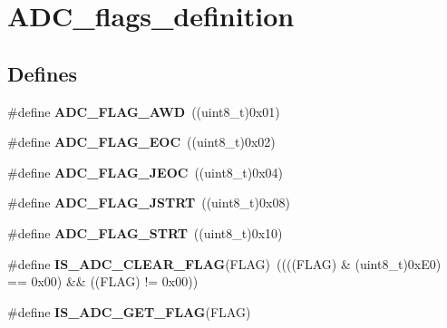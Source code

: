 \hypertarget{group__ADC__flags__definition}{
\section{ADC\_\-flags\_\-definition}
\label{group__ADC__flags__definition}
}
\subsection*{Defines}
\begin{DoxyCompactItemize}
\item 
\hypertarget{group__ADC__flags__definition_gadb75a4b430fb84950232b7a8f3a6a877}{
\#define {\bfseries ADC\_\-FLAG\_\-AWD}~((uint8\_\-t)0x01)}
\label{group__ADC__flags__definition_gadb75a4b430fb84950232b7a8f3a6a877}

\item 
\hypertarget{group__ADC__flags__definition_gaf2c6fdf7e9ab63b778149e5fb56413d4}{
\#define {\bfseries ADC\_\-FLAG\_\-EOC}~((uint8\_\-t)0x02)}
\label{group__ADC__flags__definition_gaf2c6fdf7e9ab63b778149e5fb56413d4}

\item 
\hypertarget{group__ADC__flags__definition_ga4df8eea8ab83d98104ee15a339743a4e}{
\#define {\bfseries ADC\_\-FLAG\_\-JEOC}~((uint8\_\-t)0x04)}
\label{group__ADC__flags__definition_ga4df8eea8ab83d98104ee15a339743a4e}

\item 
\hypertarget{group__ADC__flags__definition_ga278f4e866f4322c1120bf0db5301c432}{
\#define {\bfseries ADC\_\-FLAG\_\-JSTRT}~((uint8\_\-t)0x08)}
\label{group__ADC__flags__definition_ga278f4e866f4322c1120bf0db5301c432}

\item 
\hypertarget{group__ADC__flags__definition_gad0c59ae7749c69b5b91f2c533db1b619}{
\#define {\bfseries ADC\_\-FLAG\_\-STRT}~((uint8\_\-t)0x10)}
\label{group__ADC__flags__definition_gad0c59ae7749c69b5b91f2c533db1b619}

\item 
\hypertarget{group__ADC__flags__definition_gac5b6fb60ec921255b05261ec04573470}{
\#define {\bfseries IS\_\-ADC\_\-CLEAR\_\-FLAG}(FLAG)~((((FLAG) \& (uint8\_\-t)0xE0) == 0x00) \&\& ((FLAG) != 0x00))}
\label{group__ADC__flags__definition_gac5b6fb60ec921255b05261ec04573470}

\item 
\#define {\bfseries IS\_\-ADC\_\-GET\_\-FLAG}(FLAG)
\end{DoxyCompactItemize}


